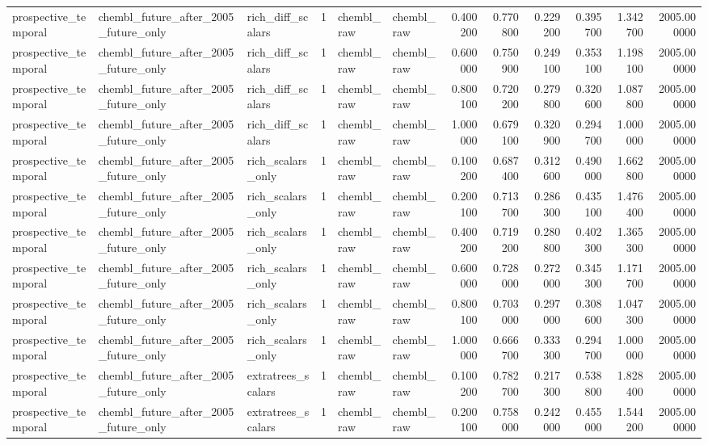 \begin{longtable}{lllrllrrrrrr}
prospective\_temporal & chembl\_future\_after\_2005\_future\_only & rich\_diff\_scalars & 1 & chembl\_raw & chembl\_raw & 0.400200 & 0.770800 & 0.229200 & 0.395700 & 1.342700 & 2005.000000 \\
prospective\_temporal & chembl\_future\_after\_2005\_future\_only & rich\_diff\_scalars & 1 & chembl\_raw & chembl\_raw & 0.600000 & 0.750900 & 0.249100 & 0.353100 & 1.198100 & 2005.000000 \\
prospective\_temporal & chembl\_future\_after\_2005\_future\_only & rich\_diff\_scalars & 1 & chembl\_raw & chembl\_raw & 0.800100 & 0.720200 & 0.279800 & 0.320600 & 1.087800 & 2005.000000 \\
prospective\_temporal & chembl\_future\_after\_2005\_future\_only & rich\_diff\_scalars & 1 & chembl\_raw & chembl\_raw & 1.000000 & 0.679100 & 0.320900 & 0.294700 & 1.000000 & 2005.000000 \\
prospective\_temporal & chembl\_future\_after\_2005\_future\_only & rich\_scalars\_only & 1 & chembl\_raw & chembl\_raw & 0.100200 & 0.687400 & 0.312600 & 0.490000 & 1.662800 & 2005.000000 \\
prospective\_temporal & chembl\_future\_after\_2005\_future\_only & rich\_scalars\_only & 1 & chembl\_raw & chembl\_raw & 0.200100 & 0.713700 & 0.286300 & 0.435100 & 1.476400 & 2005.000000 \\
prospective\_temporal & chembl\_future\_after\_2005\_future\_only & rich\_scalars\_only & 1 & chembl\_raw & chembl\_raw & 0.400200 & 0.719200 & 0.280800 & 0.402300 & 1.365300 & 2005.000000 \\
prospective\_temporal & chembl\_future\_after\_2005\_future\_only & rich\_scalars\_only & 1 & chembl\_raw & chembl\_raw & 0.600000 & 0.728000 & 0.272000 & 0.345300 & 1.171700 & 2005.000000 \\
prospective\_temporal & chembl\_future\_after\_2005\_future\_only & rich\_scalars\_only & 1 & chembl\_raw & chembl\_raw & 0.800100 & 0.703000 & 0.297000 & 0.308600 & 1.047300 & 2005.000000 \\
prospective\_temporal & chembl\_future\_after\_2005\_future\_only & rich\_scalars\_only & 1 & chembl\_raw & chembl\_raw & 1.000000 & 0.666700 & 0.333300 & 0.294700 & 1.000000 & 2005.000000 \\
prospective\_temporal & chembl\_future\_after\_2005\_future\_only & extratrees\_scalars & 1 & chembl\_raw & chembl\_raw & 0.100200 & 0.782700 & 0.217300 & 0.538800 & 1.828400 & 2005.000000 \\
prospective\_temporal & chembl\_future\_after\_2005\_future\_only & extratrees\_scalars & 1 & chembl\_raw & chembl\_raw & 0.200100 & 0.758000 & 0.242000 & 0.455000 & 1.544200 & 2005.000000 \\

\end{longtable}
